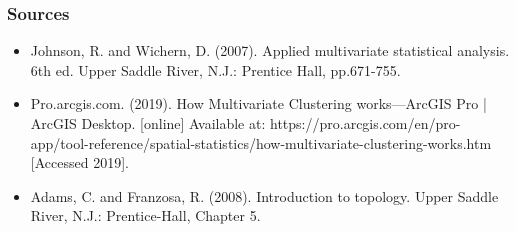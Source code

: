 \documentclass{beamer}
\begin{document}
\begin{frame}
\frametitle{Sources}
\begin{itemize}
\item Johnson, R. and Wichern, D. (2007). Applied multivariate statistical analysis. 6th ed. Upper Saddle River, N.J.: Prentice Hall, pp.671-755.
\item Pro.arcgis.com. (2019). How Multivariate Clustering works—ArcGIS Pro | ArcGIS Desktop. [online] Available at: https://pro.arcgis.com/en/pro-app/tool-reference/spatial-statistics/how-multivariate-clustering-works.htm [Accessed 2019].
\item Adams, C. and Franzosa, R. (2008). Introduction to topology. Upper Saddle River, N.J.: Prentice-Hall, Chapter 5.
\end{itemize}
\end{frame}
\end{document}
